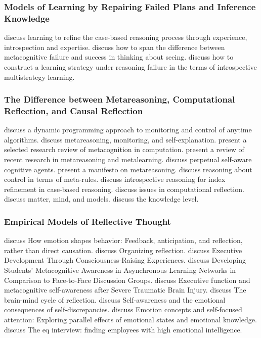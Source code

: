 \subsubsection{Models of Learning by Repairing Failed Plans and Inference Knowledge}

\cite{leake:1996} discuss learning to refine the case-based reasoning process through experience, introspection and expertise.
\cite{levin:2004} discuss how to span the difference between metacognitive failure and success in thinking about seeing.
\cite{cox:1996} discuss how to construct a learning strategy under reasoning failure in the terms of introspective multistrategy learning.

\subsubsection{The Difference between Metareasoning, Computational Reflection, and Causal Reflection}

\cite{hansen:2001} discuss a dynamic programming approach to monitoring and control of anytime algorithms.
\cite{cox:2007a} discuss metareasoning, monitoring, and self-explanation.
\cite{cox:2005} present a selected research review of metacognition in computation.
\cite{anderson:2007} present a review of recent research in metareasoning and metalearning.
\cite{cox:2007b} discuss perpetual self-aware cognitive agents.
\cite{cox:2008} present a manifesto on metareasoning.
\cite{davis:1980} discuss reasoning about control in terms of meta-rules.
\cite{fox:2001} discuss introspective reasoning for index refinement in case-based reasoning.
\cite{maes:1988} discuss issues in computational reflection.
\cite{minsky:1968} discuss matter, mind, and models.
\cite{newell:1982} discuss the knowledge level.

\subsubsection{Empirical Models of Reflective Thought}


\cite{baumeister:2007} discuss How emotion shapes behavior: Feedback, anticipation, and reflection, rather than direct causation.
\cite{vince:2002} discuss Organizing reflection.
\cite{mirvis:2008} discuss Executive Development Through Consciousness-Raising Experiences.
\cite{michalsky:2007} discuss Developing Students' Metacognitive Awareness in Asynchronous Learning Networks in Comparison to Face-to-Face Discussion Groups.
\cite{bivona:2008} discuss Executive function and metacognitive self-awareness after Severe Traumatic Brain Injury.
\cite{irannejad:2001} discuss The brain-mind cycle of reflection.
\cite{phillips:2005} discuss Self-awareness and the emotional consequences of self-discrepancies.
\cite{silvia:2006} discuss Emotion concepts and self-focused attention: Exploring parallel effects of emotional states and emotional knowledge.
\cite{lynn:2008} discuss The eq interview: finding employees with high emotional intelligence.


